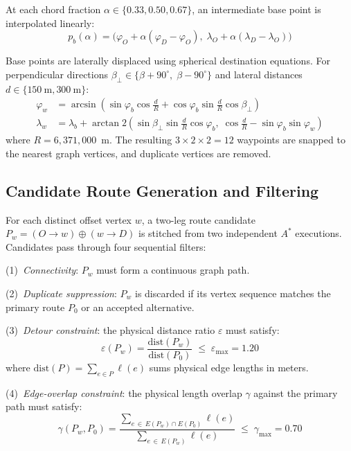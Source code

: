 \documentclass[11pt,conference]{IEEEtran}
\begin{document}
At each chord fraction $\alpha \in \{0.33, 0.50, 0.67\}$, an intermediate base point is interpolated linearly:
\begin{equation}
  p_b(\alpha) = \bigl(\varphi_O + \alpha(\varphi_D-\varphi_O),\;\lambda_O + \alpha(\lambda_D-\lambda_O)\bigr)
  \label{eq:chord_point}
\end{equation}

Base points are laterally displaced using spherical destination equations.
For perpendicular directions $\beta_\perp \in \{\beta{+}90^\circ,\;\beta{-}90^\circ\}$ and lateral distances $d \in \{150~\text{m}, 300~\text{m}\}$:
\begin{align}
  \varphi_w &= \arcsin\!\left(\sin\varphi_b\cos\tfrac{d}{R} + \cos\varphi_b\sin\tfrac{d}{R}\cos\beta_\perp\right) \label{eq:dest_lat}\\
  \lambda_w &= \lambda_b + \arctan2\!\left(\sin\beta_\perp\sin\tfrac{d}{R}\cos\varphi_b,\;
              \cos\tfrac{d}{R}-\sin\varphi_b\sin\varphi_w\right) \label{eq:dest_lng}
\end{align}
where $R = 6{,}371{,}000$~m.
The resulting $3\times2\times2 = 12$ waypoints are snapped to the nearest graph vertices, and duplicate vertices are removed.

\subsection{Candidate Route Generation and Filtering}

For each distinct offset vertex $w$, a two-leg route candidate $P_w = (O\to w)\oplus(w\to D)$ is stitched from two independent $A^*$ executions.
Candidates pass through four sequential filters:

(1)~\textit{Connectivity}: $P_w$ must form a continuous graph path.

(2)~\textit{Duplicate suppression}: $P_w$ is discarded if its vertex sequence matches the primary route $P_0$ or an accepted alternative.

(3)~\textit{Detour constraint}: the physical distance ratio $\varepsilon$ must satisfy:
\begin{equation}
  \varepsilon(P_w) = \frac{\mathrm{dist}(P_w)}{\mathrm{dist}(P_0)} \;\le\; \varepsilon_{\max} = 1.20
  \label{eq:detour}
\end{equation}
where $\mathrm{dist}(P) = \sum_{e\in P} \ell(e)$ sums physical edge lengths in meters.

(4)~\textit{Edge-overlap constraint}: the physical length overlap $\gamma$ against the primary path must satisfy:
\begin{equation}
  \gamma(P_w, P_0) = \frac{\sum_{e\,\in\, E(P_w)\cap E(P_0)}\ell(e)}{\sum_{e\,\in\, E(P_w)}\ell(e)} \;\le\; \gamma_{\max} = 0.70
  \label{eq:overlap}
\end{equation}
\end{document}
